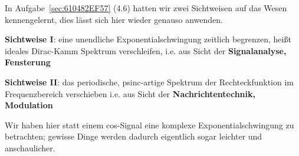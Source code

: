 \begin{Ansatz}
In Aufgabe~\ref{sec:610482EF57} (4.6) hatten wir zwei Sichtweisen auf das Wesen kennengelernt, dies
lässt sich hier wieder genauso anwenden.

\textbf{Sichtweise I}: eine unendliche Exponentialschwingung zeitlich
begrenzen, heißt ideales Dirac-Kamm Spektrum verschleifen,
i.e. aus Sicht der \textbf{Signalanalyse, Fensterung}

\textbf{Sichtweise II}: das periodische, psinc-artige Spektrum der Rechteckfunktion
im Frequenzbereich verschieben i.e. aus Sicht der \textbf{Nachrichtentechnik, Modulation}

Wir haben hier statt einem cos-Signal eine komplexe Exponentialschwingung
zu betrachten; gewisse Dinge werden dadurch eigentlich sogar leichter und anschaulicher.


\end{Ansatz}
